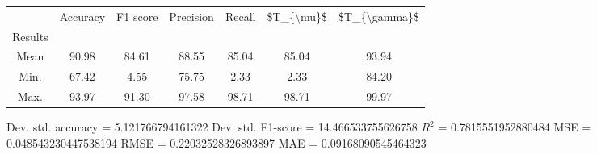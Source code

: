 \begin{tabular}{|c|c|c|c|c|c|c|}
\toprule
{} &  Accuracy &  F1 score &  Precision &  Recall &  \$T\_\{\textbackslash mu\}\$ &  \$T\_\{\textbackslash gamma\}\$ \\
Results &           &           &            &         &            &               \\
\hline
Mean    &     90.98 &     84.61 &      88.55 &   85.04 &      85.04 &         93.94 \\
Min.    &     67.42 &      4.55 &      75.75 &    2.33 &       2.33 &         84.20 \\
Max.    &     93.97 &     91.30 &      97.58 &   98.71 &      98.71 &         99.97 \\
\bottomrule
\end{tabular}

 Dev. std. accuracy = 5.121766794161322
 Dev. std. F1-score = 14.466533755626758
 $R^2$ = 0.7815551952880484
 MSE = 0.048543230447538194
 RMSE = 0.22032528326893897
 MAE = 0.09168090545464323